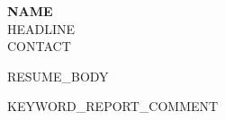 \documentclass[10pt,letterpaper]{article}
\begin{document}
\begin{center}
{\LARGE \textbf{ {{NAME}} }}\\
{{HEADLINE}}\\
{{CONTACT}}
\end{center}

{{RESUME_BODY}}

{{KEYWORD_REPORT_COMMENT}}
\end{document}
